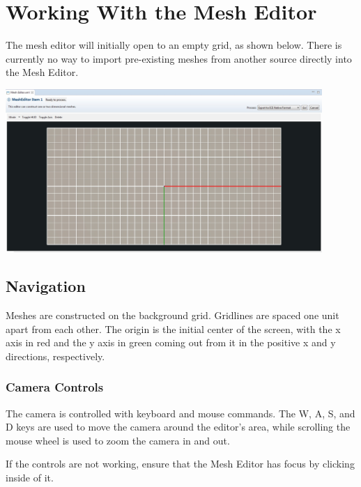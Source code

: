 \documentclass{article}
\begin{document}
\section{Working With the Mesh Editor}

The mesh editor will initially open to an empty grid, as shown below. There is
currently no way to import pre-existing meshes from another source directly
into the Mesh Editor.

\begin{center}
\includegraphics[width=12cm]{images/EmptyMeshEditor.jpg}
\end{center}

\subsection{Navigation}

Meshes are constructed on the background grid. Gridlines are spaced one unit
apart from each other. The origin is the initial center of the screen, with the
x axis in red and the y axis in green coming out from it in the positive x and y
directions, respectively. 

\subsubsection{Camera Controls}

The camera is controlled with keyboard and mouse commands. The W, A, S, and D
keys are used to move the camera around the editor's area, while scrolling the
mouse wheel is used to zoom the camera in and out. 

If the controls are not working, ensure that the Mesh Editor has focus by
clicking inside of it.
\end{document}
